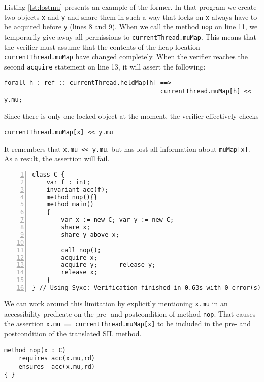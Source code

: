 Listing \ref{lst:lostmu} presents an example of the former. 
In that program we create two objects \lstinline!x! and \lstinline!y! and share them in such a way that locks on \lstinline!x! always have to be acquired before \lstinline!y! (lines 8 and 9).
When we call the method \lstinline!nop! on line 11, we temporarily give away all permissions to \lstinline!currentThread.muMap!.
This means that the verifier must assume that the contents of the heap location \lstinline!currentThread.muMap! have changed completely.
When the verifier reaches the second \lstinline[language=Chalice]!acquire! statement on line 13, it will assert the following:
\begin{lstlisting}[language=SIL]
forall h : ref :: currentThread.heldMap[h] ==> 
                                           currentThread.muMap[h] << y.mu;
\end{lstlisting}
Since there is only one locked object at the moment, the verifier effectively checks 
\begin{lstlisting}
currentThread.muMap[x] << y.mu
\end{lstlisting}
It remembers that \lstinline!x.mu << y.mu!, but has lost all information about \lstinline!muMap[x]!.
As a result, the assertion will fail.

\begin{lstlisting}[float,caption={Losing information about \lstinline!mu!.},label=lst:lostmu,language=chalice,numbers=left]
class C {
    var f : int;
    invariant acc(f);
    method nop(){}
    method main()
    {
        var x := new C; var y := new C;
        share x;        
        share y above x;

        call nop();
        acquire x;
        acquire y;      release y;
        release x;
    }
} // Using Syxc: Verification finished in 0.63s with 0 error(s)
\end{lstlisting}

We can work around this limitation by explicitly mentioning \lstinline!x.mu! in an accessibility predicate on the pre- and postcondition of method \lstinline!nop!.
That causes the assertion \lstinline!x.mu == currentThread.muMap[x]! to be included in the pre- and postcondition of the translated SIL method.

\begin{lstlisting}[float,caption={Modified method \lstinline!nop! from listing \ref{lst:lostmu}, causes verification to succeed.},label=lst:lostmufixed,language=chalice]
method nop(x : C)
    requires acc(x.mu,rd)
    ensures  acc(x.mu,rd)
{ }
\end{lstlisting}

